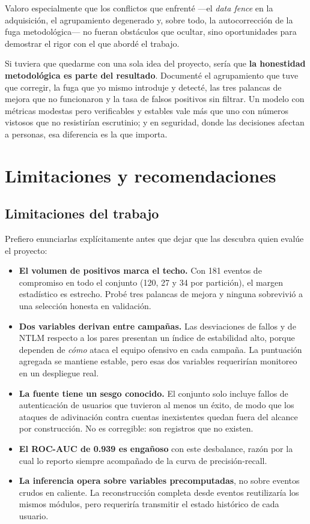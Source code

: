 \documentclass[12pt, a4paper]{article}
\begin{document}
Valoro especialmente que los conflictos que enfrenté ---el \textit{data fence} en la adquisición, el
agrupamiento degenerado y, sobre todo, la autocorrección de la fuga metodológica--- no fueran
obstáculos que ocultar, sino oportunidades para demostrar el rigor con el que abordé el trabajo.

Si tuviera que quedarme con una sola idea del proyecto, sería que \textbf{la honestidad metodológica
es parte del resultado}. Documenté el agrupamiento que tuve que corregir, la fuga que yo mismo
introduje y detecté, las tres palancas de mejora que no funcionaron y la tasa de falsos positivos sin
filtrar. Un modelo con métricas modestas pero verificables y estables vale más que uno con números
vistosos que no resistirían escrutinio; y en seguridad, donde las decisiones afectan a personas, esa
diferencia es la que importa.

\section{Limitaciones y recomendaciones}

\subsection{Limitaciones del trabajo}

Prefiero enunciarlas explícitamente antes que dejar que las descubra quien evalúe el proyecto:

\begin{itemize}[leftmargin=1.5cm]
  \item \textbf{El volumen de positivos marca el techo.} Con 181 eventos de compromiso en todo el
        conjunto (120, 27 y 34 por partición), el margen estadístico es estrecho. Probé tres palancas
        de mejora y ninguna sobrevivió a una selección honesta en validación.
  \item \textbf{Dos variables derivan entre campañas.} Las desviaciones de fallos y de NTLM respecto
        a los pares presentan un índice de estabilidad alto, porque dependen de \textit{cómo} ataca
        el equipo ofensivo en cada campaña. La puntuación agregada se mantiene estable, pero esas dos
        variables requerirían monitoreo en un despliegue real.
  \item \textbf{La fuente tiene un sesgo conocido.} El conjunto solo incluye fallos de autenticación
        de usuarios que tuvieron al menos un éxito, de modo que los ataques de adivinación contra
        cuentas inexistentes quedan fuera del alcance por construcción. No es corregible: son
        registros que no existen.
  \item \textbf{El ROC-AUC de 0.939 es engañoso} con este desbalance, razón por la cual lo reporto
        siempre acompañado de la curva de precisión-recall.
  \item \textbf{La inferencia opera sobre variables precomputadas}, no sobre eventos crudos en
        caliente. La reconstrucción completa desde eventos reutilizaría los mismos módulos, pero
        requeriría transmitir el estado histórico de cada usuario.
\end{itemize}
\end{document}
